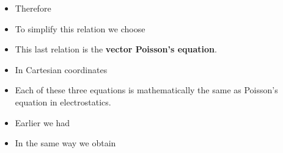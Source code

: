 \begin{ELunit}
\begin{itemize}
\tightlist
\item
  Therefore
\end{itemize}


\begin{itemize}
\tightlist
\item
  To simplify this relation we choose
\end{itemize}


\begin{itemize}
\tightlist
\item
  This last relation is the \textbf{vector Poisson's equation}.
\item
  In Cartesian coordinates
\end{itemize}


\begin{itemize}
\tightlist
\item
  Each of these three equations is mathematically the same as Poisson's equation in electrostatics.
\item
  Earlier we had
\end{itemize}


\end{ELunit}

\begin{ELjoin}

\begin{itemize}
\tightlist
\item
  In the same way we obtain
\end{itemize}

\begin{ELimportant}{}


\end{ELimportant}

\end{ELjoin}

